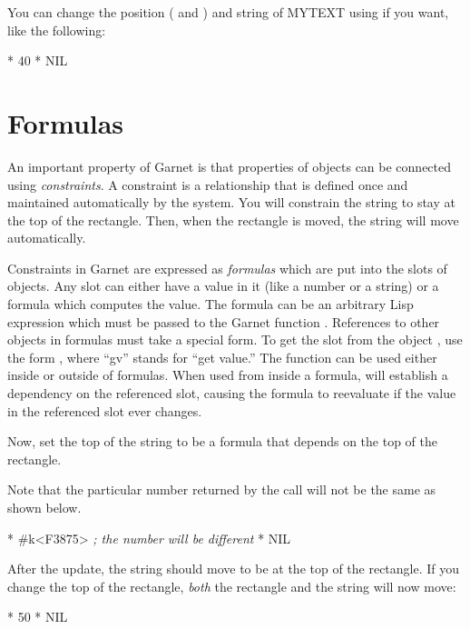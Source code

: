 You can change the position ( and ) and string of
MYTEXT using  if you want, like the following:
\begin{programexample}
* 
40
* 
NIL
\end{programexample}


\section{Formulas}
An important property of Garnet is that properties of objects can be
connected using {\it constraints}.  A constraint is a relationship that is
defined once and maintained automatically by the system.  You
will constrain the string to stay at the top of the rectangle.  Then, when
the rectangle is moved, the string will move automatically.

Constraints in Garnet are expressed as {\it formulas} which are put into the
slots of objects.  Any slot can either have a value in it (like a number or
a string) or a formula which computes the value.  The formula can be an
arbitrary Lisp expression which must be passed to the Garnet function
.  References to other objects in formulas must take a special
form.  To get the slot  from the object
, use the form , where
``gv'' stands for ``get value.''  The  function can be used either
inside or outside of formulas.  When used from inside a formula,  will
establish a dependency on the referenced slot, causing the formula to
reevaluate if the value in the referenced slot ever changes.

Now, set the top of the string to be a formula that depends on the
top of the rectangle.

Note that the particular number returned by the  call will not
be the same as shown below.
\begin{programexample}
* 
\#k<F3875>   {\it ; the number will be different}
* 
NIL
\end{programexample}

After the update, the string should move to be at the top of the rectangle.
If you change the top of the rectangle, {\it both} the rectangle and the string
will now move:
\begin{programexample}
* 
50
* 
NIL
\end{programexample}


